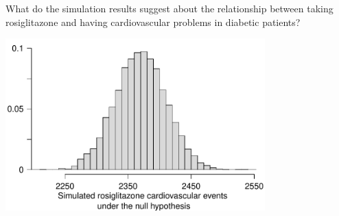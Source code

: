 {\begin{parts}
\begin{subparts}
\item What do the simulation results suggest about the relationship between taking rosiglitazone and having cardiovascular problems in diabetic patients?
\end{subparts}
\begin{center}
\includegraphics[width = 0.75\textwidth]{01/figures/eoce/avandia/avandia_RandHist} \\
\end{center}
\end{parts}
}{}

\textA{\pagebreak}


